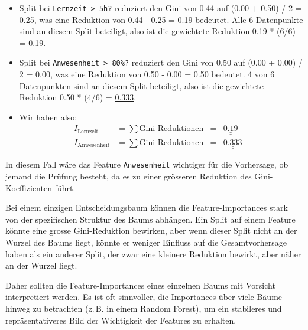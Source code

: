\begin{myexercise}
    \begin{myanswer}
        \begin{itemize}
            \item Split bei \texttt{Lernzeit > 5h?} reduziert den Gini von 0.44 auf (0.00 + 0.50) / 2 = 0.25, was eine Reduktion von 0.44 - 0.25 = 0.19 bedeutet. Alle 6 Datenpunkte sind an diesem Split beteiligt, also ist die gewichtete Reduktion 0.19 * (6/6) = \underline{0.19}.
            \item Split bei \texttt{Anwesenheit > 80\%?} reduziert den Gini von 0.50 auf (0.00 + 0.00) / 2 = 0.00, was eine Reduktion von 0.50 - 0.00 = 0.50 bedeutet. 4 von 6 Datenpunkten sind an diesem Split beteiligt, also ist die gewichtete Reduktion 0.50 * (4/6) = \underline{0.333}.
            \item Wir haben also:
                  \[
                      \begin{aligned}
                          I_\text{Lernzeit}    & = \sum \text{Gini-Reduktionen} & = & \underline{\underline{0.19}}  & \\
                          I_\text{Anwesenheit} & = \sum \text{Gini-Reduktionen} & = & \underline{\underline{0.333}} &
                      \end{aligned}
                  \]
        \end{itemize}
        In diesem Fall wäre das Feature \texttt{Anwesenheit} wichtiger für die Vorhersage, ob jemand die Prüfung besteht, da es zu einer grösseren Reduktion des Gini-Koeffizienten führt.
    \end{myanswer}
\end{myexercise}

\begin{myremark}
    Bei einem einzigen Entscheidungsbaum können die Feature-Importances stark von der spezifischen Struktur des Baums abhängen. Ein Split auf einem Feature könnte eine grosse Gini-Reduktion bewirken, aber wenn dieser Split nicht an der Wurzel des Baums liegt, könnte er weniger Einfluss auf die Gesamtvorhersage haben als ein anderer Split, der zwar eine kleinere Reduktion bewirkt, aber näher an der Wurzel liegt.

    Daher sollten die Feature-Importances eines einzelnen Baums mit Vorsicht interpretiert werden. Es ist oft sinnvoller, die Importances über viele Bäume hinweg zu betrachten (z.\,B. in einem Random Forest), um ein stabileres und repräsentativeres Bild der Wichtigkeit der Features zu erhalten.
\end{myremark}